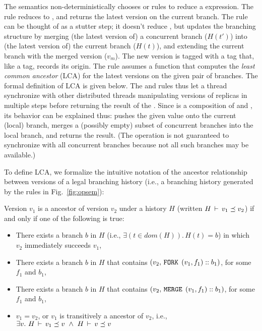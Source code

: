 The semantics non-deterministically chooses  or
 rules to reduce a  expression. The
 rule reduces  to \C{()}, and returns the
latest version on the current branch. The  rule
can be thought of as a stutter step; it doesn't reduce , but
updates the branching structure by merging (the latest version of) a
concurrent branch ($H(t')$) into (the latest version of) the current
branch ($H(t)$), and extending the current branch with the merged
version ($v_m$). The new version is tagged with a  tag that,
like a  tag, records its origin. The rule assumes a function
 that computes the \emph{least common ancestor} (LCA) for the
latest versions on the given pair of branches. The formal definition
of LCA is given below. The  and
 rules thus let a thread synchronize with other
distributed threads manipulating versions of replicas in multiple
steps before returning the result of the . Since  is a
composition of  and , its behavior can be explained
thus:  pushes the given value onto the current (local) branch,
merges a (possibly empty) subset of concurrent branches into the local
branch, and returns the result.  (The operation is not guaranteed to
synchronize with all concurrent branches because not all such branches
may be available.)

To define LCA, we formalize the intuitive notation of the ancestor
relationship between versions of a legal branching history (i.e., a
branching history generated by the rules in Fig.~\ref{fig:opsem}):

\begin{definition} 
Version $v_1$ is a ancestor of version $v_2$ under a history
$H$ (written $H\,\vdash\,v_1 \preceq v_2$) if and only if one of the
following is true:
\begin{itemize}
  \item There exists a branch $b$ in $H$ (i.e., $\exists(t\in
  dom(H)).\,H(t) = b$) in which $v_2$ immediately succeeds
  $v_1$,
  \item There exists a branch $b$ in $H$ that contains $(v_2, 
  \,{\tt FORK}\,\; (v_1,f_1)::b_1)$, for some $f_1$ and $b_1$,
  \item There exists a branch $b$ in $H$ that contains
  $(v_2, \,{\tt MERGE}\,\;(v_1,f_1)::b_1)$, for some $f_1$ and $b_1$,
  \item $v_1 = v_2$, or $v_1$ is transitively a ancestor of
  $v_2$, i.e., $\exists v.~ H\,\vdash\,v_1 \preceq v ~\wedge~
  H\,\vdash\,v \preceq v$ 
\end{itemize}
\end{definition}

